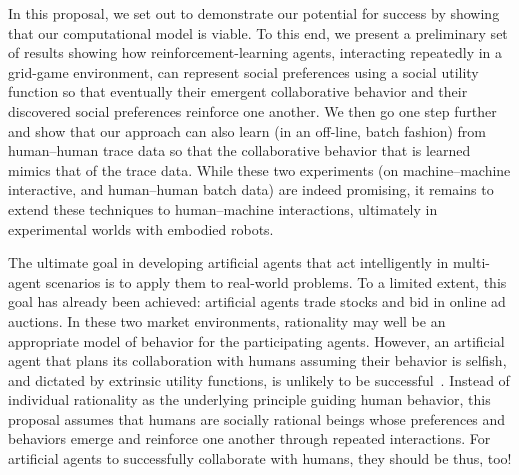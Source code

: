 In this proposal, we set out to demonstrate our potential for success
by showing that our computational model is viable.  To this end,
we present a preliminary set of results showing how
reinforcement-learning agents, interacting repeatedly in a grid-game
environment, can represent social preferences using a social utility
function so that eventually their emergent collaborative behavior and
their discovered social preferences reinforce one another.  We then go
one step further and show that our approach can also learn (in an
off-line, batch fashion) from human--human trace data so that the
collaborative behavior that is learned mimics that of the trace data.
While these two experiments (on machine--machine interactive, and
human--human batch data) are indeed promising, it remains to extend
these techniques to human--machine interactions, ultimately in
experimental worlds with embodied robots.

The ultimate goal in developing artificial agents that act
intelligently in multi-agent scenarios is to apply them to real-world
problems.  To a limited extent, this goal has already been achieved:
artificial agents trade stocks and bid in online ad auctions.  In
these two market environments, rationality may well be an appropriate
model of behavior for the participating agents.  However,
an artificial agent that plans its collaboration with humans assuming
their behavior is selfish, and dictated by extrinsic utility
functions, is unlikely to be successful~\cite{gal04}.  Instead of individual
rationality as the underlying principle guiding human behavior, this
proposal assumes that humans are socially rational beings whose
preferences and behaviors emerge and reinforce one another through
repeated interactions.  For artificial agents to successfully
collaborate with humans, they should be thus, too!


